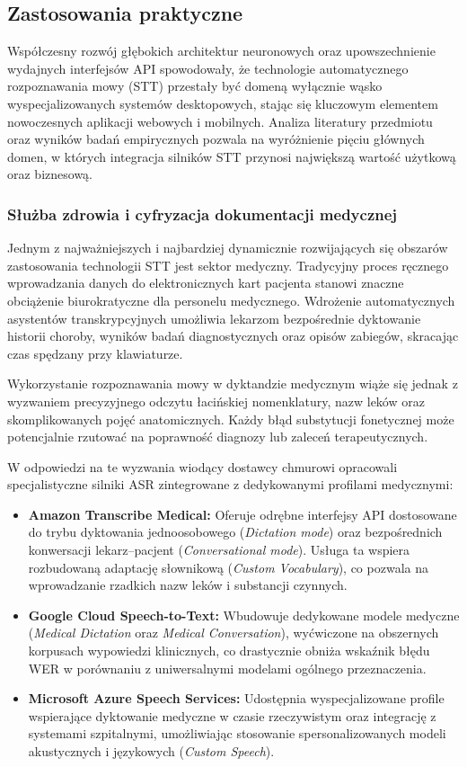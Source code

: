 \subsection{Zastosowania praktyczne}
\label{subsec:practical_applications}

Współczesny rozwój głębokich architektur neuronowych oraz upowszechnienie wydajnych interfejsów API spowodowały, że technologie automatycznego rozpoznawania mowy (STT) przestały być domeną wyłącznie wąsko wyspecjalizowanych systemów desktopowych, stając się kluczowym elementem nowoczesnych aplikacji webowych i mobilnych. Analiza literatury przedmiotu oraz wyników badań empirycznych pozwala na wyróżnienie pięciu głównych domen, w których integracja silników STT przynosi największą wartość użytkową oraz biznesową.
\subsubsection{Służba zdrowia i cyfryzacja dokumentacji medycznej}

Jednym z najważniejszych i najbardziej dynamicznie rozwijających się obszarów zastosowania technologii STT jest sektor medyczny. Tradycyjny proces ręcznego wprowadzania danych do elektronicznych kart pacjenta stanowi znaczne obciążenie biurokratyczne dla personelu medycznego. Wdrożenie automatycznych asystentów transkrypcyjnych umożliwia lekarzom bezpośrednie dyktowanie historii choroby, wyników badań diagnostycznych oraz opisów zabiegów, skracając czas spędzany przy klawiaturze.

Wykorzystanie rozpoznawania mowy w dyktandzie medycznym wiąże się jednak z wyzwaniem precyzyjnego odczytu łacińskiej nomenklatury, nazw leków oraz skomplikowanych pojęć anatomicznych. Każdy błąd substytucji fonetycznej może potencjalnie rzutować na poprawność diagnozy lub zaleceń terapeutycznych.

W odpowiedzi na te wyzwania wiodący dostawcy chmurowi opracowali specjalistyczne silniki ASR zintegrowane z dedykowanymi profilami medycznymi:
\begin{itemize}
    \item \textbf{Amazon Transcribe Medical:} Oferuje odrębne interfejsy API dostosowane do trybu dyktowania jednoosobowego (\textit{Dictation mode}) oraz bezpośrednich konwersacji lekarz--pacjent (\textit{Conversational mode}). Usługa ta wspiera rozbudowaną adaptację słownikową (\textit{Custom Vocabulary}), co pozwala na wprowadzanie rzadkich nazw leków i substancji czynnych.
    \item \textbf{Google Cloud Speech-to-Text:} Wbudowuje dedykowane modele medyczne (\textit{Medical Dictation} oraz \textit{Medical Conversation}), wyćwiczone na obszernych korpusach wypowiedzi klinicznych, co drastycznie obniża wskaźnik błędu WER w porównaniu z uniwersalnymi modelami ogólnego przeznaczenia.
    \item \textbf{Microsoft Azure Speech Services:} Udostępnia wyspecjalizowane profile wspierające dyktowanie medyczne w czasie rzeczywistym oraz integrację z systemami szpitalnymi, umożliwiając stosowanie spersonalizowanych modeli akustycznych i językowych (\textit{Custom Speech}).
\end{itemize}

